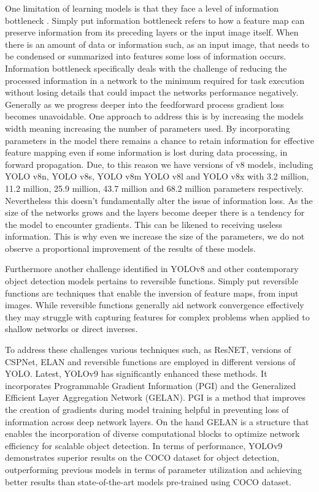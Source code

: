 One limitation of learning models is that they face a level of information bottleneck \cite{tishby2015deep}. Simply put information bottleneck refers to how a feature map can preserve information from its preceding layers or the input image itself. When there is an amount of data or information such, as an input image, that needs to be condensed or summarized into features some loss of information occurs. Information bottleneck specifically deals with the challenge of reducing the processed information in a network to the minimum required for task execution without losing details that could impact the networks performance negatively. Generally as we progress deeper into the feedforward process gradient loss becomes unavoidable. One approach to address this is by increasing the models width meaning increasing the number of parameters used. By incorporating parameters in the model there remains a chance to retain information for effective feature mapping even if some information is lost during data processing, in forward propagation. Due, to this reason we have versions of v8 models, including YOLO v8n, YOLO v8s, YOLO v8m YOLO v8l and YOLO v8x with 3.2 million, 11.2 million, 25.9 million, 43.7 million and 68.2 million parameters respectively. Nevertheless this doesn't fundamentally alter the issue of information loss. As the size of the networks grows and the layers become deeper there is a tendency for the model to encounter gradients. This can be likened to receiving useless information. This is why even we increase the size of the parameters, we do not observe a proportional improvement of the results of these models.

Furthermore another challenge identified in YOLOv8 and other contemporary object detection models pertains to reversible functions. Simply put reversible functions are techniques that enable the inversion of feature maps, from input images. While reversible functions generally aid network convergence effectively they may struggle with capturing features for complex problems when applied to shallow networks or direct inverses.


To address these challenges various techniques such, as ResNET, versions of CSPNet, ELAN and reversible functions are employed in different versions of YOLO. Latest, YOLOv9 \cite{wang2024yolov9}  has significantly enhanced these methods. It incorporates Programmable Gradient Information (PGI) and the Generalized Efficient Layer Aggregation Network (GELAN). PGI is a method that improves the creation of gradients during model training helpful in preventing loss of information across deep network layers. On the hand GELAN is a structure that enables the incorporation of diverse computational blocks to optimize network efficiency for scalable object detection. In terms of performance, YOLOv9 demonstrates superior results on the COCO dataset for object detection, outperforming previous models in terms of parameter utilization and achieving better results than state-of-the-art models pre-trained using COCO dataset. 

